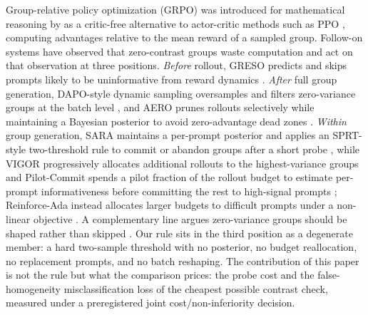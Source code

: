 \documentclass[11pt]{article}
\begin{document}
Group-relative policy optimization (GRPO) was introduced for mathematical reasoning by \citet{shao2024deepseekmath} as a critic-free alternative to actor-critic methods such as PPO \citep{schulman2017proximal}, computing advantages relative to the mean reward of a sampled group. Follow-on systems have observed that zero-contrast groups waste computation and act on that observation at three positions. \emph{Before} rollout, GRESO predicts and skips prompts likely to be uninformative from reward dynamics \citep{zheng2025greso}. \emph{After} full group generation, DAPO-style dynamic sampling oversamples and filters zero-variance groups at the batch level \citep{yu2025dapo}, and AERO prunes rollouts selectively while maintaining a Bayesian posterior to avoid zero-advantage dead zones \citep{zhang2026aero}. \emph{Within} group generation, SARA maintains a per-prompt posterior and applies an SPRT-style two-threshold rule to commit or abandon groups after a short probe \citep{nomand2026sara}, while VIGOR progressively allocates additional rollouts to the highest-variance groups \citep{jiang2026vigor} and Pilot-Commit spends a pilot fraction of the rollout budget to estimate per-prompt informativeness before committing the rest to high-signal prompts \citep{kim2026pilotcommit}; Reinforce-Ada instead allocates larger budgets to difficult prompts under a non-linear objective \citep{xiong2025reinforceada}. A complementary line argues zero-variance groups should be shaped rather than skipped \citep{le2025rlzvp}. Our rule sits in the third position as a degenerate member: a hard two-sample threshold with no posterior, no budget reallocation, no replacement prompts, and no batch reshaping. The contribution of this paper is not the rule but what the comparison prices: the probe cost and the false-homogeneity misclassification loss of the cheapest possible contrast check, measured under a preregistered joint cost/non-inferiority decision.
\end{document}
